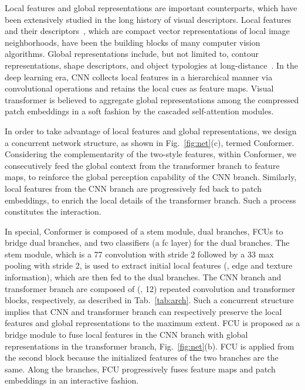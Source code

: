 \documentclass[10pt,twocolumn,letterpaper]{article}
\begin{document}
Local features and global representations are important counterparts, which have been extensively studied in the long history of visual descriptors. Local features and their descriptors~\cite{Sift04,Gabor1991,LBP2002}, which are compact vector representations of local image neighborhoods, have been the building blocks of many computer vision algorithms. Global representations include, but not limited to, contour representations, shape descriptors, and object typologies at long-distance~\cite{Local-global2008}. In the deep learning era, CNN collects local features in a hierarchical manner via convolutional operations and retains the local cues as feature maps. Visual transformer is believed to aggregate global representations among the compressed patch embeddings in a soft fashion by the cascaded self-attention modules.


In order to take advantage of local features and global representations, we design a concurrent network structure, as shown in Fig.~\ref{fig:net}(c), termed Conformer. 
Considering the complementarity of the two-style features, within Conformer, we consecutively feed the global context from the transformer branch to feature maps, to reinforce the global perception capability of the CNN branch. Similarly, local features from the CNN branch are progressively fed back to patch embeddings, to enrich the local details of the transformer branch. Such a process constitutes the interaction.

In special, Conformer is composed of a stem module, dual branches, FCUs to bridge dual branches, and two classifiers (a fc layer) for the dual branches. 
The stem module, which is a 77 convolution with stride 2 followed by a 33 max pooling with stride 2, is used to extract initial local features (, edge and texture information), which are then fed to the dual branches. 
The CNN branch and transformer branch are composed of  (, 12) repeated convolution and transformer blocks, respectively, as described in Tab.~\ref{tab:arch}.
Such a concurrent structure implies that CNN and transformer branch can respectively preserve the local features and global representations to the maximum extent.
FCU is proposed as a bridge module to fuse local features in the CNN branch with global representations in the transformer branch, Fig.~\ref{fig:net}(b). FCU is applied from the second block because the initialized features of the two branches are the same. Along the branches, FCU progressively fuses feature maps and patch embeddings in an interactive fashion. 
\end{document}
